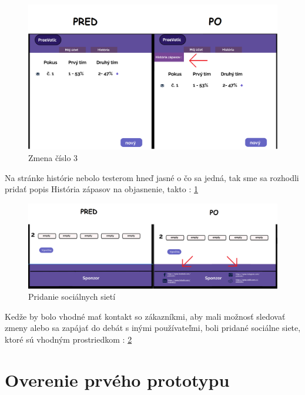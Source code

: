 \begin{figure}[h!]
	
	\includegraphics[width=.9\textwidth]{figures/3}
	
	\centering
	
	\caption{ Zmena číslo 3 \label{3}}
	
\end{figure}

Na stránke histórie nebolo testerom hneď jasné o čo sa jedná, tak sme sa rozhodli pridať popis História zápasov na objasnenie, takto : \ref{3}
\\



\begin{figure}[h!]
	
	\includegraphics[width=.9\textwidth]{figures/4}
	
	\centering
	
	\caption{ Pridanie sociálnych sietí \label{4}}
	
\end{figure}

Kedže by bolo vhodné mať kontakt so zákazníkmi, aby mali možnosť sledovať zmeny alebo sa zapájať do debát s inými používateľmi, boli pridané sociálne siete, ktoré sú vhodným prostriedkom : \ref{4}





\section{Overenie prvého prototypu}



